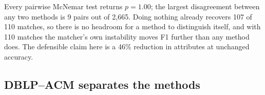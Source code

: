 \documentclass[11pt]{article}
\begin{document}
Every pairwise McNemar test returns $p = 1.00$; the largest disagreement between any two
methods is 9 pairs out of 2{,}665. Doing nothing already recovers 107 of 110 matches, so
there is no headroom for a method to distinguish itself, and with 110 matches the matcher's
own instability moves F1 further than any method does. The defensible claim here is a 46\%
reduction in attributes at unchanged accuracy.

\subsection{DBLP--ACM separates the methods}
\label{sec:dblp}

\begin{table}[h]
\centering
{}
\caption{DBLP--ACM, 2{,}224 ground-truth matches.}
\end{table}
\end{document}
